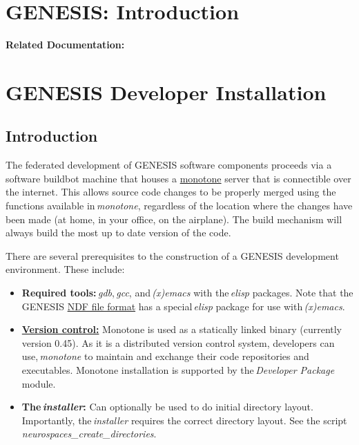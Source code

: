 \documentclass[12pt]{article}
\begin{document}
\section*{GENESIS: Introduction}

{\bf Related Documentation:}

\section*{GENESIS Developer Installation}

\subsection*{Introduction}

The federated development of GENESIS software components proceeds via a software buildbot machine that houses a \href{http://monotone.ca/}{monotone} server that is connectible over the internet. This allows source code changes to be properly merged using the functions available in\,{\it monotone}, regardless of the location where the changes have been made (at home, in your office, on the airplane). The build mechanism will always build the most up to date version of the code.

There are several prerequisites to the construction of a GENESIS development environment. These include:

\begin{itemize}

\item {\bf Required tools:}\,{\it gdb},\,{\it gcc}, and\,{\it (x)emacs} with the\,{\it elisp} packages. Note that the GENESIS \href{../ndf-file-format/ndf-file-format.tex}{NDF file format} has a special\,{\it elisp} package for use with\,{\it (x)emacs}.
\item \href{../version-control/version-control.tex}{{\bf Version control:}} Monotone is used as a statically linked binary (currently version 0.45). As it is a distributed version control system, developers can use,\,{\it monotone} to maintain and exchange their code repositories and executables. Monotone installation is supported by the\,{\it Developer Package} module. 
\item {\bf  The\,{\it installer}:} Can optionally be used to do initial directory layout. Importantly, the\,{\it installer} requires the correct directory layout. See the script {\it neurospaces\_create\_directories}.

\end{itemize}
\end{document}
